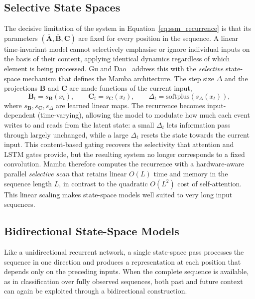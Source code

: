 \documentclass[%
    BCOR=10mm,
    DIV=13,
    toc=bibliography,
    toc=listof,
    oneside,
    12pt,
]{scrbook}
\begin{document}
\subsection{Selective State Spaces}
\label{subsec:selective_ssm}

The decisive limitation of the system in
Equation~\ref{eq:ssm_recurrence} is that its parameters
$(\overline{\mathbf{A}}, \overline{\mathbf{B}}, \mathbf{C})$ are fixed for
every position in the sequence. A linear time-invariant model cannot
selectively emphasise or ignore individual inputs on the basis of their
content, applying identical dynamics regardless of which element is being
processed. Gu and Dao~\cite{gu2023mamba} address this
with the \emph{selective} state-space mechanism that defines the Mamba
architecture. The step size $\Delta$ and the projections $\mathbf{B}$ and
$\mathbf{C}$ are made functions of the current input,
\begin{equation}
  \mathbf{B}_t = s_{\mathbf{B}}(x_t),
  \qquad
  \mathbf{C}_t = s_{\mathbf{C}}(x_t),
  \qquad
  \Delta_t = \mathrm{softplus}\!\left( s_{\Delta}(x_t) \right),
  \label{eq:mamba_selection}
\end{equation}
where $s_{\mathbf{B}}, s_{\mathbf{C}}, s_{\Delta}$ are learned linear maps. The
recurrence becomes input-dependent (time-varying), allowing the model to
modulate how much each event writes to and reads from the latent state: a
small $\Delta_t$ lets information pass through largely unchanged, while a large
$\Delta_t$ resets the state towards the current input. This content-based gating
recovers the selectivity that attention and LSTM gates provide, but the
resulting system no longer corresponds to a fixed convolution. Mamba therefore
computes the recurrence with a hardware-aware parallel \emph{selective scan}
that retains linear $O(L)$ time and memory in the sequence length $L$, in
contrast to the quadratic $O(L^2)$ cost of self-attention. This linear scaling
makes state-space models well suited to very long input sequences.

\subsection{Bidirectional State-Space Models}
\label{subsec:bimamba}

Like a unidirectional recurrent network, a single state-space pass processes
the sequence in one direction and produces a representation at each position
that depends only on the preceding inputs. When the complete sequence is
available, as in classification over fully observed sequences, both past and
future context can again be exploited through a bidirectional construction.
\end{document}
